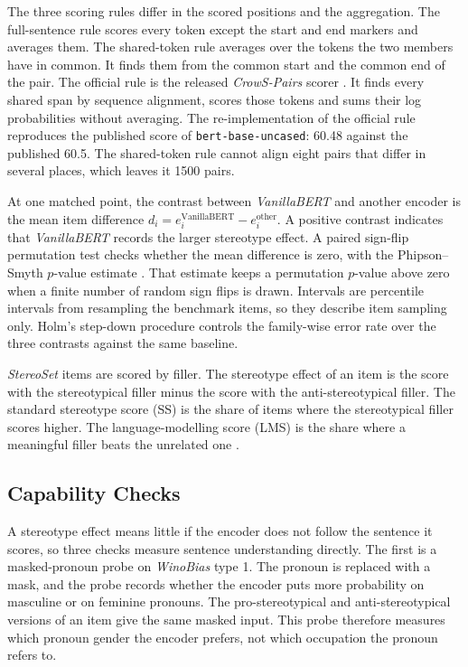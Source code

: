 \documentclass[sigconf,natbib=true]{acmart}
\begin{document}
The three scoring rules differ in the scored positions and the aggregation. The
full-sentence rule scores every token except the start and end markers and
averages them. The shared-token rule averages over the tokens the two members have in common.
It finds them from the common start and the common end of the pair.
The official rule is the released \emph{CrowS-Pairs} scorer
\citep{nangia2020crows}. It finds every shared span by sequence alignment, scores
those tokens and sums their log probabilities without averaging. The
re-implementation of the official rule reproduces the published score of
\texttt{bert-base-uncased}: 60.48 against the published 60.5. The shared-token
rule cannot align eight pairs that differ in several places, which leaves it
1500 pairs.

At one matched point, the contrast between \emph{VanillaBERT} and another encoder
is the mean item difference $d_i = e_i^{\text{VanillaBERT}} - e_i^{\text{other}}$. A positive contrast
indicates that \emph{VanillaBERT} records the larger stereotype effect. A paired
sign-flip permutation test checks whether the mean difference is zero, with the
Phipson--Smyth $p$-value estimate \citep{phipson2010permutation}. That estimate
keeps a permutation $p$-value above zero when a finite number of random sign
flips is drawn. Intervals are percentile intervals from resampling the benchmark
items, so they describe item sampling only. Holm's step-down procedure controls
the family-wise error rate over the three contrasts against the same baseline.

\emph{StereoSet} items are scored by filler. The stereotype effect of an item is
the score with the stereotypical filler minus the score with the
anti-stereotypical filler. The standard stereotype score (SS) is the share of
items where the stereotypical filler scores higher. The language-modelling score
(LMS) is the share where a meaningful filler beats the unrelated one
\citep{nadeem2021stereoset}.

\subsection{Capability Checks}
\label{sec:capmethod}

A stereotype effect means little if the encoder does not follow the sentence it
scores, so three checks measure sentence understanding directly. The first is a
masked-pronoun probe on \emph{WinoBias} type 1. The pronoun is replaced with a
mask, and the probe records whether the encoder puts more probability on
masculine or on feminine pronouns. The pro-stereotypical and anti-stereotypical
versions of an item give the same masked input. This probe therefore measures
which pronoun gender the encoder prefers, not which occupation the pronoun
refers to.
\end{document}
